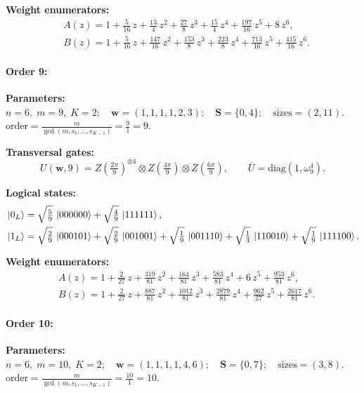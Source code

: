 \documentclass[pdflatex,sn-nature]{sn-jnl}%
\theoremstyle{thmstyleone}%
\theoremstyle{thmstyletwo}%
\theoremstyle{thmstylethree}%
\begin{document}
\begin{appendices}
\noindent\textbf{Weight enumerators:}
\begin{align*}
    &A(z) = 1 + \tfrac{5}{16}\,z + \tfrac{13}{4}\,z^{2} + \tfrac{27}{8}\,z^{3} + \tfrac{15}{4}\,z^{4} + \tfrac{197}{16}\,z^{5} + 8\,z^{6}, \\
    &B(z) = 1 + \tfrac{5}{16}\,z + \tfrac{147}{16}\,z^{2} + \tfrac{153}{8}\,z^{3} + \tfrac{223}{8}\,z^{4} + \tfrac{713}{16}\,z^{5} + \tfrac{415}{16}\,z^{6}.
\end{align*}

\paragraph{\textbf{Order 9:}}
\noindent\textbf{Parameters:} $n=6,\; m=9,\; K=2;\quad \mathbf w=(1, 1, 1, 1, 2, 3);\quad \mathbf S=\{0, 4\};\quad \text{sizes}=\left(2, 11\right).$ $\displaystyle \text{order}=\frac{m}{\gcd(m,s_1,\dots,s_{K-1})}=\frac{9}{1}=9.$

\noindent\textbf{Transversal gates:}
\[
    U(\mathbf w,9)=Z \left(\tfrac{2\pi}{9}\right)^{\otimes4} \otimes Z \left(\tfrac{4\pi}{9}\right) \otimes Z \left(\tfrac{6\pi}{9}\right),\qquad
    \overline U=\mathrm{diag}(1,\omega_{9}^{4}).
\]

\noindent\textbf{Logical states:}
\begin{align*}
    &\ket{0_L} = \sqrt{\tfrac{5}{9}}\,\ket{000000} + \sqrt{\tfrac{4}{9}}\,\ket{111111}, \\
    &\ket{1_L} = \sqrt{\tfrac{2}{9}}\,\ket{000101} + \sqrt{\tfrac{2}{9}}\,\ket{001001} + \sqrt{\tfrac{1}{9}}\,\ket{001110} + \sqrt{\tfrac{1}{3}}\,\ket{110010} + \sqrt{\tfrac{1}{9}}\,\ket{111100}.
\end{align*}

\noindent\textbf{Weight enumerators:}
\begin{align*}
    &A(z) = 1 + \tfrac{2}{27}\,z + \tfrac{319}{81}\,z^{2} + \tfrac{164}{81}\,z^{3} + \tfrac{583}{81}\,z^{4} + 6\,z^{5} + \tfrac{953}{81}\,z^{6}, \\
    &B(z) = 1 + \tfrac{2}{27}\,z + \tfrac{887}{81}\,z^{2} + \tfrac{1012}{81}\,z^{3} + \tfrac{2879}{81}\,z^{4} + \tfrac{962}{27}\,z^{5} + \tfrac{2617}{81}\,z^{6}.
\end{align*}

\paragraph{\textbf{Order 10:}}
\noindent\textbf{Parameters:} $n=6,\; m=10,\; K=2;\quad \mathbf w=(1, 1, 1, 1, 4, 6);\quad \mathbf S=\{0, 7\};\quad \text{sizes}=\left(3, 8\right).$ $\displaystyle \text{order}=\frac{m}{\gcd(m,s_1,\dots,s_{K-1})}=\frac{10}{1}=10.$


\end{appendices}
\end{document}
